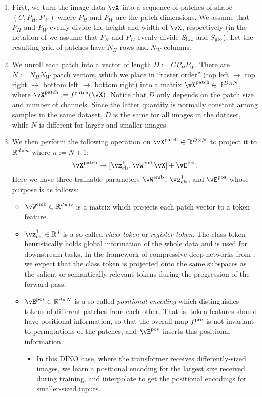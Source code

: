 \documentclass[\toplevelprefix/book-main.tex]{subfiles}
\begin{document}
\begin{enumerate}
    \item First, we turn the image data \(\vX\) into a sequence of patches of shape \((C, P_{H}, P_{W})\) where \(P_{H}\) and \(P_{W}\) are the patch dimensions. We assume that \(P_{H}\) and \(P_{W}\) evenly divide the height and width of \(\vX\), respectively (in the notation of  we assume that \(P_{H}\) and \(P_{W}\) evenly divide \(S_{\mathrm{loc}}\) and \(S_{\mathrm{glo}}\)). Let the resulting grid of patches have \(N_{H}\) rows and \(N_{W}\) columns.
    \item We unroll each patch into a vector of length \(D := CP_{H}P_{W}\). There are \(N := N_{H}N_{W}\) patch vectors, which we place in ``raster order'' (top left \(\to\) top right \(\to\) bottom left \(\to\) bottom right) into a matrix \(\vX^{\patch} \in \R^{D \times N}\), where \(\vX^{\patch} := f^{\patch}(\vX)\). Notice that \(D\) only depends on the patch size and number of channels. Since the latter quantity is normally constant among samples in the same dataset, \(D\) is the same for all images in the dataset, while \(N\) is different for larger and smaller images.
    \item We then perform the following operation on \(\vX^{\patch} \in \R^{D \times N}\) to project it to \(\mathbb{R}^{d \times n}\) where \(n := N + 1\):
    \begin{equation}
        \vX^{\patch} \mapsto [\vz_{\cls}^{1}, \vW^{\emb}\vX] + \vE^{\pos}.
    \end{equation}
    Here we have three trainable parameters \(\vW^{\emb}\), \(\vz_{\cls}^{1}\), and \(\vE^{\pos}\) whose purpose is as follows:
    \begin{itemize}
        \item \(\vW^{\emb} \in \R^{d \times D}\) is a matrix which projects each patch vector to a token feature.
        \item \(\vz_{\cls}^{1} \in \R^{d}\) is a so-called \textit{class token} or \textit{register token}. The class token heuristically holds global information of the whole data and is used for downstream tasks. In the framework of compressive deep networks from , we expect that the class token is projected onto the same subspaces as the salient or semantically relevant tokens during the progression of the forward pass.
        \item \(\vE^{\pos} \in \R^{d \times N}\) is a so-called \textit{positional encoding} which distinguishes tokens of different patches from each other. That is, token features should have positional information, so that the overall map \(f^{\mathrm{pre}}\) is not invariant to permutations of the patches, and \(\vE^{\pos}\) inserts this positional information. 
        \begin{itemize}
            \item In this DINO case, where the transformer receives differently-sized images, we learn a positional encoding for the largest size received during training, and interpolate to get the positional encodings for smaller-sized inputs.
        \end{itemize}
    \end{itemize}
\end{enumerate}
\end{document}
